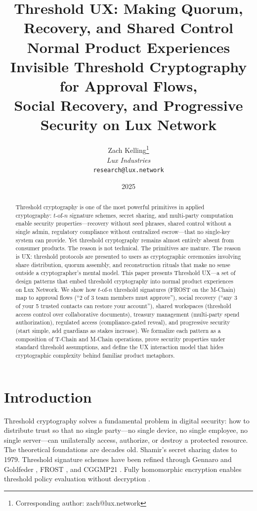\documentclass[11pt,a4paper]{article}
\title{\textbf{Threshold UX: Making Quorum, Recovery, and Shared Control Normal Product Experiences}\\[6pt]
\large Invisible Threshold Cryptography for Approval Flows,\\Social Recovery, and Progressive Security on Lux Network}
\author{
Zach Kelling\thanks{Corresponding author: zach@lux.network}\\
\textit{Lux Industries}\\
\texttt{research@lux.network}
}
\date{2025}
\begin{document}
\luxcoverpage

\begin{abstract}
Threshold cryptography is one of the most powerful primitives in applied
cryptography: $t$-of-$n$ signature schemes, secret sharing, and multi-party
computation enable security properties---recovery without seed phrases, shared
control without a single admin, regulatory compliance without centralized
escrow---that no single-key system can provide. Yet threshold cryptography
remains almost entirely absent from consumer products. The reason is not
technical. The primitives are mature. The reason is UX: threshold protocols
are presented to users as cryptographic ceremonies involving share distribution,
quorum assembly, and reconstruction rituals that make no sense outside a
cryptographer's mental model. This paper presents Threshold UX---a set of
design patterns that embed threshold cryptography into normal product
experiences on Lux Network. We show how $t$-of-$n$ threshold signatures
(FROST on the M-Chain) map to approval flows (``2 of 3 team members must
approve''), social recovery (``any 3 of your 5 trusted contacts can restore
your account''), shared workspaces (threshold access control over collaborative
documents), treasury management (multi-party spend authorization), regulated
access (compliance-gated reveal), and progressive security (start simple,
add guardians as stakes increase). We formalize each pattern as a composition
of T-Chain and M-Chain operations, prove security properties under standard
threshold assumptions, and define the UX interaction model that hides
cryptographic complexity behind familiar product metaphors.
\end{abstract}

\section{Introduction}\label{sec:intro}

Threshold cryptography solves a fundamental problem in digital security: how
to distribute trust so that no single party---no single device, no single
employee, no single server---can unilaterally access, authorize, or destroy
a protected resource. The theoretical foundations are decades old. Shamir's
secret sharing \cite{shamir1979share} dates to 1979. Threshold signature
schemes have been refined through Gennaro and Goldfeder \cite{gennaro2018fast},
FROST \cite{komlo2020frost}, and CGGMP21 \cite{canetti2021cggmp}. Fully
homomorphic encryption enables threshold policy evaluation without
decryption \cite{gentry2009fhe}.
\end{document}
